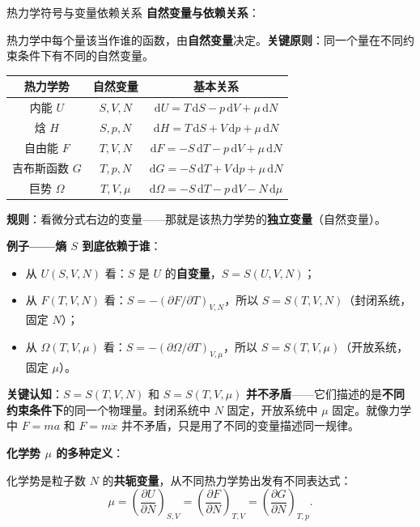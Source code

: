 \begin{insightbox}{热力学符号与变量依赖关系}
\vspace{0.5em}
\textbf{自然变量与依赖关系}：

热力学中每个量该当作谁的函数，由\textbf{自然变量}决定。\textbf{关键原则}：同一个量在不同约束条件下有不同的自然变量。

\begin{center}
\renewcommand{\arraystretch}{1.4}
\begin{tabular}{|c|c|c|}
\hline
\textbf{热力学势} & \textbf{自然变量} & \textbf{基本关系} \\
\hline
内能 $U$ & $S, V, N$ & $\mathrm{d}U = T\,\mathrm{d}S - p\,\mathrm{d}V + \mu\,\mathrm{d}N$ \\
焓 $H$ & $S, p, N$ & $\mathrm{d}H = T\,\mathrm{d}S + V\,\mathrm{d}p + \mu\,\mathrm{d}N$ \\
自由能 $F$ & $T, V, N$ & $\mathrm{d}F = -S\,\mathrm{d}T - p\,\mathrm{d}V + \mu\,\mathrm{d}N$ \\
吉布斯函数 $G$ & $T, p, N$ & $\mathrm{d}G = -S\,\mathrm{d}T + V\,\mathrm{d}p + \mu\,\mathrm{d}N$ \\
巨势 $\Omega$ & $T, V, \mu$ & $\mathrm{d}\Omega = -S\,\mathrm{d}T - p\,\mathrm{d}V - N\,\mathrm{d}\mu$ \\
\hline
\end{tabular}
\end{center}

\textbf{规则}：看微分式右边的变量——那就是该热力学势的\textbf{独立变量}（自然变量）。

\textbf{例子——熵 $S$ 到底依赖于谁}：
\begin{itemize}[nosep]
  \item 从 $U(S,V,N)$ 看：$S$ 是 $U$ 的\textbf{自变量}，$S = S(U,V,N)$；
  \item 从 $F(T,V,N)$ 看：$S = -(\partial F/\partial T)_{V,N}$，所以 $S = S(T,V,N)$（封闭系统，固定 $N$）；
  \item 从 $\Omega(T,V,\mu)$ 看：$S = -(\partial \Omega/\partial T)_{V,\mu}$，所以 $S = S(T,V,\mu)$（开放系统，固定 $\mu$）。
\end{itemize}

\textbf{关键认知}：$S = S(T,V,N)$ 和 $S = S(T,V,\mu)$ \textbf{并不矛盾}——它们描述的是\textbf{不同约束条件下}的同一个物理量。封闭系统中 $N$ 固定，开放系统中 $\mu$ 固定。就像力学中 $F = ma$ 和 $F = m\ddot{x}$ 并不矛盾，只是用了不同的变量描述同一规律。

\vspace{0.5em}
\textbf{化学势 $\mu$ 的多种定义}：

化学势是粒子数 $N$ 的\textbf{共轭变量}，从不同热力学势出发有不同表达式：
\[
  \mu = \left(\frac{\partial U}{\partial N}\right)_{S,V}
    = \left(\frac{\partial F}{\partial N}\right)_{T,V}
    = \left(\frac{\partial G}{\partial N}\right)_{T,p} .
\]


\end{insightbox}
